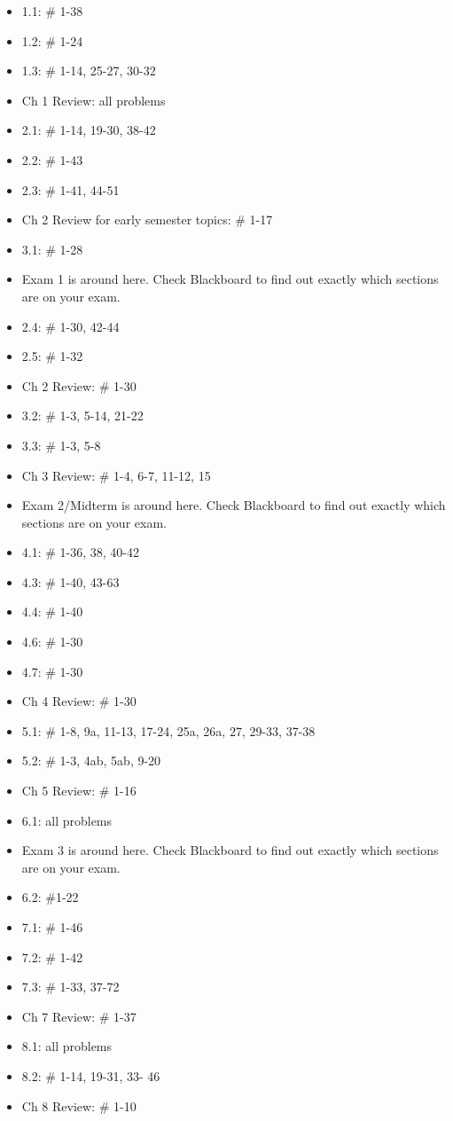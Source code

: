 \documentclass{article}
\begin{document}
\begin{itemize}
\item 1.1:  \# 1-38
\item 1.2:  \# 1-24
\item 1.3:  \# 1-14, 25-27, 30-32
\item Ch 1 Review:  all problems
\item 2.1:  \# 1-14, 19-30, 38-42
\item 2.2:  \# 1-43
\item 2.3:  \# 1-41, 44-51
\item Ch 2 Review for early semester topics: \# 1-17
\item 3.1: \# 1-28
\item Exam 1 is around here.  Check Blackboard to find out exactly which sections are on your exam.
\item 2.4:  \# 1-30, 42-44
\item 2.5: \# 1-32
\item Ch 2 Review: \# 1-30
\item 3.2: \# 1-3, 5-14, 21-22
\item 3.3: \# 1-3, 5-8
\item Ch 3 Review: \# 1-4, 6-7, 11-12, 15
\item Exam 2/Midterm is around here.  Check Blackboard to find out exactly which sections are on your exam.
\item 4.1:  \# 1-36, 38, 40-42
\item 4.3: \# 1-40, 43-63
\item 4.4: \# 1-40
\item 4.6: \# 1-30
\item 4.7: \# 1-30
\item Ch 4 Review: \# 1-30 
\item 5.1: \# 1-8, 9a, 11-13, 17-24, 25a, 26a, 27, 29-33, 37-38
\item 5.2: \# 1-3, 4ab, 5ab, 9-20
\item Ch 5 Review: \# 1-16
\item 6.1: all problems
\item Exam 3 is around here.  Check Blackboard to find out exactly which sections are on your exam.
\newpage\thispagestyle{empty}
\item 6.2: \#1-22
\item 7.1: \# 1-46
\item 7.2: \# 1-42
\item 7.3: \# 1-33, 37-72
\item Ch 7 Review: \# 1-37
\item 8.1: all problems
\item 8.2:  \# 1-14, 19-31, 33- 46
\item Ch 8 Review: \# 1-10
\end{itemize}
\end{document}
